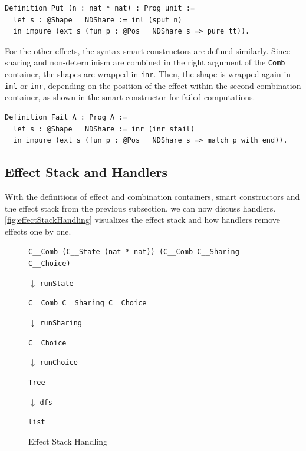 \documentclass[a4paper, 11pt, fleqn, twoside]{scrreprt}
\newcommand{\cinl}[1]{\texttt{#1}}
\begin{document}
\begin{verbatim}
Definition Put (n : nat * nat) : Prog unit :=
  let s : @Shape _ NDShare := inl (sput n)
  in impure (ext s (fun p : @Pos _ NDShare s => pure tt)).
\end{verbatim}

For the other effects, the syntax smart constructors are defined similarly.
Since sharing and non-determinism are combined in the right argument of the \cinl{Comb} container, the shapes are wrapped in \cinl{inr}.
Then, the shape is wrapped again in \cinl{inl} or \cinl{inr}, depending on the position of the effect within the second combination container, as shown in the smart constructor for failed computations.

\begin{verbatim}
Definition Fail A : Prog A :=
  let s : @Shape _ NDShare := inr (inr sfail)
  in impure (ext s (fun p : @Pos _ NDShare s => match p with end)).
\end{verbatim}

\subsection{Effect Stack and Handlers}
\label{subsec:effectstack}

With the definitions of effect and combination containers, smart constructors and the effect stack from the previous subsection, we can now discuss handlers.
\autoref{fig:effectStackHandling} visualizes the effect stack and how handlers remove effects one by one.

\begin{figure}[H]
{\centering \cinl{C__Comb (C__State (nat * nat)) (C__Comb C__Sharing C__Choice)} \par}

\hspace*{.48\textwidth} {\Large \boldmath $\downarrow$} \texttt{runState}

{\centering \cinl{C__Comb C__Sharing C__Choice} \par}

\hspace*{.48\textwidth} {\Large \boldmath $\downarrow$} \texttt{runSharing}

{\centering \cinl{C__Choice} \par}

\hspace*{.48\textwidth} {\Large \boldmath $\downarrow$} \texttt{runChoice}

{\centering \cinl{Tree} \par}

\hspace*{.48\textwidth} {\Large \boldmath $\downarrow$} \texttt{dfs}

{\centering \cinl{list} \par}
\caption{Effect Stack Handling}
\label{fig:effectStackHandling}
\end{figure}
\end{document}
